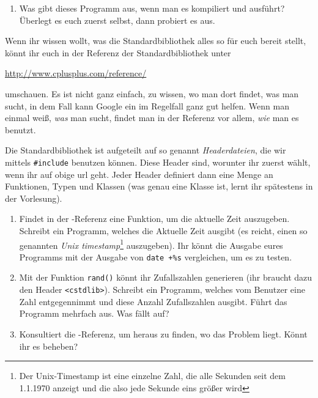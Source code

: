 \begin{praxis}
    \begin{enumerate}
        \item Was gibt dieses Programm aus, wenn man es kompiliert und ausführt?
              Überlegt es euch zuerst selbst, dann probiert es aus.
    \end{enumerate}

    Wenn ihr wissen wollt, was die Standardbibliothek alles so für euch bereit
    stellt, könnt ihr euch in der Referenz der Standardbibliothek unter

    \url{http://www.cplusplus.com/reference/}

    umschauen. Es ist nicht ganz einfach, zu wissen, wo man dort findet, was man
    sucht, in dem Fall kann Google ein im Regelfall ganz gut helfen. Wenn man
    einmal weiß, \emph{was} man sucht, findet man in der Referenz vor allem,
    \emph{wie} man es benutzt.

    Die Standardbibliothek ist aufgeteilt auf so genannt \emph{Headerdateien}, die
    wir mittels \texttt{\#include} benutzen können. Diese Header sind, worunter ihr
    zuerst wählt, wenn ihr auf obige url geht. Jeder Header definiert dann eine
    Menge an Funktionen, Typen und Klassen (was genau eine Klasse ist, lernt ihr
    spätestens in der Vorlesung).

    \begin{enumerate}[resume]
        \item Findet in der \Cpp-Referenz eine Funktion, um die aktuelle Zeit
              auszugeben. Schreibt ein Programm, welches die Aktuelle Zeit ausgibt
              (es reicht, einen so genannten \emph{Unix timestamp}\footnote{Der
                  Unix-Timestamp ist eine einzelne Zahl, die alle Sekunden seit dem
                  1.1.1970 anzeigt und die also jede Sekunde eins größer wird} auszugeben).
              Ihr könnt die Ausgabe eures Programms mit der Ausgabe von \texttt{date
                  +\%s} vergleichen, um es zu testen.
        \item Mit der Funktion \texttt{rand()} könnt ihr Zufallszahlen generieren
              (ihr braucht dazu den Header \texttt{<cstdlib>}). Schreibt ein
              Programm, welches vom Benutzer eine Zahl entgegennimmt und diese Anzahl
              Zufallszahlen ausgibt. Führt das Programm mehrfach aus. Was fällt auf?
        \item Konsultiert die \Cpp-Referenz, um heraus zu finden, wo das Problem
              liegt. Könnt ihr es beheben?
    \end{enumerate}
\end{praxis}

